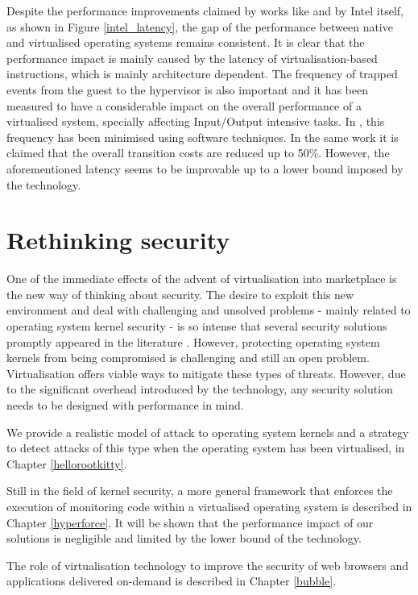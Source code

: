 Despite the performance improvements claimed by works like \cite{rearch, avoidvmexit} and by Intel itself, as shown in Figure \ref{intel_latency}, the gap of the performance between native and virtualised operating systems remains consistent.  
It is clear that the performance impact is mainly caused by the latency of virtualisation-based instructions, which is mainly architecture dependent. The frequency of trapped events from the guest to the hypervisor is also important and it has been measured to have a considerable impact on the overall performance of a virtualised system, specially affecting Input/Output intensive tasks. In \cite{avoidvmexit}, this frequency has been minimised using software techniques. In the same work it is claimed that the overall transition costs are reduced up to 50\%. However, the aforementioned latency seems to be improvable up to a lower bound imposed by the technology. %


\section{Rethinking security} \label{rethinking}
One of the immediate effects of the advent of virtualisation into marketplace is the new way of thinking about security. The desire to exploit this new environment and deal with challenging and unsolved problems - mainly related to operating system kernel security - is so intense that several security solutions promptly appeared in the literature \cite{9, hvmharvard, NICKLE, dynamicdatakernel}.      
However, protecting operating system kernels from being compromised is challenging and still an open problem. 
Virtualisation offers viable ways to mitigate these types of threats. However, due to the significant overhead introduced by the technology, any security solution needs to be designed with performance in mind.

We provide a realistic model of attack to operating system kernels and a strategy to detect attacks of this type when the operating system has been virtualised, in Chapter \ref{hellorootkitty}. 

Still in the field of kernel security, a more general framework that enforces the execution of monitoring code within a virtualised operating system is described in Chapter \ref{hyperforce}. 
It will be shown that the performance impact of our solutions is negligible and limited by the lower bound of the technology.

The role of virtualisation technology to improve the security of web browsers and applications delivered on-demand is described in Chapter \ref{bubble}.

